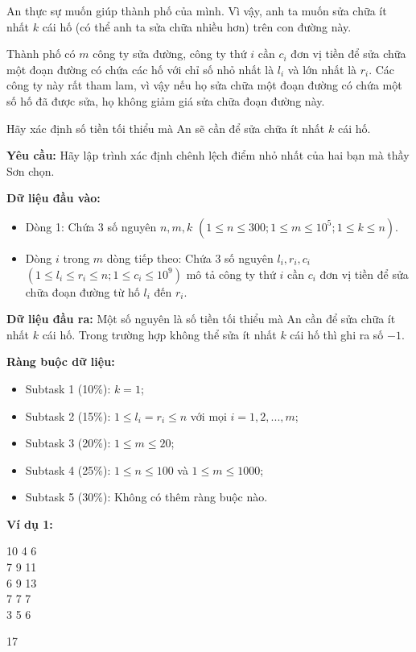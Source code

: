 \documentclass[12pt]{scrartcl}  %
\begin{document}
An thực sự muốn giúp thành phố của mình. Vì vậy, anh ta muốn sửa chữa ít nhất $k$ cái hố (có thể anh ta sửa chữa nhiều hơn) trên con đường này.

Thành phố có $m$ công ty sửa đường, công ty thứ $i$ cần $c_i$ đơn vị tiền để sửa chữa một đoạn đường có chứa các hố với chỉ số nhỏ nhất là $l_i$ và lớn nhất là $r_i$. Các công ty này rất tham lam, vì vậy nếu họ sửa chữa một đoạn đường có chứa một số hố đã được sửa, họ không giảm giá sửa chữa đoạn đường này.

Hãy xác định số tiền tối thiểu mà An sẽ cần để sửa chữa ít nhất $k$ cái hố.

\textbf{Yêu cầu:}
Hãy lập trình xác định chênh lệch điểm nhỏ nhất của hai bạn mà thầy Sơn chọn.

\textbf{Dữ liệu đầu vào:}
\begin{itemize}
    \item Dòng 1: Chứa $3$ số nguyên $n, m, k$ $(1 \leq n \leq 300; 1 \leq m \leq 10^5; 1 \leq k \leq n)$.
    \item Dòng $i$ trong $m$ dòng tiếp theo: Chứa $3$ số nguyên $l_i, r_i, c_i$ $(1 \leq l_i \leq r_i \leq n; 1 \leq c_i \leq 10^9)$ mô tả công ty thứ $i$ cần $c_i$ đơn vị tiền để sửa chữa đoạn đường từ hố $l_i$ đến $r_i$.
\end{itemize}

\textbf{Dữ liệu đầu ra:}
Một số nguyên là số tiền tối thiểu mà An cần để sửa chữa ít nhất $k$ cái hố. Trong trường hợp không thể sửa ít nhất $k$ cái hố thì ghi ra số $-1$.

\textbf{Ràng buộc dữ liệu:}
\begin{itemize}
    \item Subtask 1 (10\%): $k = 1$;
    \item Subtask 2 (15\%): $1 \leq l_i = r_i \leq n$ với mọi $i = 1, 2, ..., m$;
    \item Subtask 3 (20\%): $1 \leq m \leq 20$;
    \item Subtask 4 (25\%): $1 \leq n \leq 100$ và $1 \leq m \leq 1000$;
    \item Subtask 5 (30\%): Không có thêm ràng buộc nào.
\end{itemize}

\textbf{Ví dụ 1:}
\begin{tcolorbox}[colback=gray!5!white, colframe=blue!50!black, title=Input]
10 4 6\\
7 9 11\\
6 9 13\\
7 7 7\\
3 5 6
\end{tcolorbox}
\begin{tcolorbox}[colback=gray!5!white, colframe=green!50!black, title=Output]
17
\end{tcolorbox}
\end{document}
